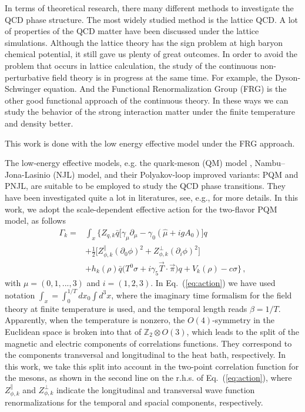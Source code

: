 \documentclass[%
reprint,
superscriptaddress,
showpacs,preprintnumbers,
 amsmath,amssymb,
 aps,
prd,
]{revtex4-1}
\def\Eq#1{Eq.~(\ref{#1})}
\begin{document}
In terms of theoretical research, there many different methods to investigate the QCD phase structure. The most widely studied method is the lattice QCD. A lot of properties of the QCD matter have been discussed under the lattice simulations. Although the lattice theory has the sign problem at high baryon chemical potential, it still gave us plenty of great outcomes. In order to avoid the problem that occurs in lattice calculation, the study of the continuous non-perturbative field theory is in progress at the same time. For example, the Dyson-Schwinger equation. And the Functional Renormalization Group (FRG) is the other good functional approach of the continuous theory. In these ways we can study the behavior of the strong interaction matter under the finite temperature and density better.

This work is done with the low energy effective model under the FRG approach. 



The low-energy effective models, e.g. the quark-meson (QM) model \cite{Schaefer:2004en}, Nambu--Jona-Lasinio (NJL) model, and their Polyakov-loop improved variants: PQM and PNJL, are suitable to be employed to study the QCD phase transitions. They have been investigated quite a lot in literatures, see, e.g., \cite{} for more details. In this work, we adopt the scale-dependent effective action for the two-flavor PQM model, as follows 
\begin{align}
\Gamma_k=&\int_x \bigg\{Z_{q,k}\bar{q} \Big [\gamma_\mu \partial_\mu -\gamma_0(\hat\mu+igA_0) \Big ]q \nonumber\\[2ex]
&+\frac{1}{2}\Big [Z_{\phi,k}^{\parallel}(\partial_0 \phi)^2+Z_{\phi,k}^{\perp}(\partial_i \phi)^2 \Big]\nonumber\\[2ex]
&+h_k(\rho)\bar{q}\big(T^0\sigma+i\gamma_5\vec{T}\cdot \vec{\pi}\big)q+V_k(\rho)-c\sigma \bigg\}\,,\label{eq:action}
\end{align}
with $\mu=(0, 1, ..., 3)$ and $i=(1, 2, 3)$. In \Eq{eq:action} we have used notation $\int_{x}=\int_0^{1/T}d x_0 \int d^3 x$, where the imaginary time formalism for the field theory at finite temperature is used, and the temporal length reads $\beta=1/T$. Apparently, when the temperature is nonzero, the $O(4)$-symmetry in the Euclidean space is broken into that of $\mathbb{Z}_2\otimes O(3)$, which leads to the split of the magnetic and electric components of correlations functions. They correspond to the components transversal and longitudinal to the heat bath, respectively. In this work, we take this split into account in the two-point correlation function for the mesons, as shown in the second line on the r.h.s. of \Eq{eq:action}, where $Z_{\phi,k}^{\parallel}$ and $Z_{\phi,k}^{\perp}$ indicate the longitudinal and transversal wave function renormalizations for the temporal and spacial components, respectively. 
\end{document}
